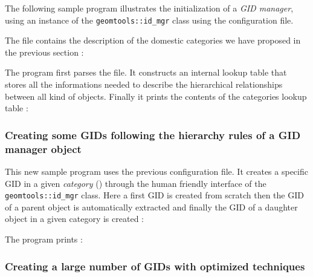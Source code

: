 \pn The  following sample program illustrates the  initialization of a
\emph{GID     manager},      using     an     instance      of     the
\texttt{geomtools::id\_mgr}          class          using          the
 configuration file.


\pagebreak
The  file contains the description
of the domestic categories we have proposed in the previous section :


\pagebreak
The program  first parses the  file. It constructs an  internal lookup
table  that  stores  all  the  informations  needed  to  describe  the
hierarchical  relationships between  all kind  of objects.  Finally it
prints the contents of the categories lookup table :

\pagebreak
\subsubsection{Creating some GIDs following the hierarchy rules of a GID manager object}

\pn     This    new     sample    program     uses     the    previous
   configuration  file.   It   creates  a
specific GID in a  given \emph{category} () through the human
friendly  interface of the  \texttt{geomtools::id\_mgr} class.  Here a
first GID is  created from scratch then the GID of  a parent object is
automatically extracted and finally the  GID of a daughter object in a
given category is created :


\pn The program prints :
\pagebreak

\subsubsection{Creating a large number of GIDs with optimized techniques}

